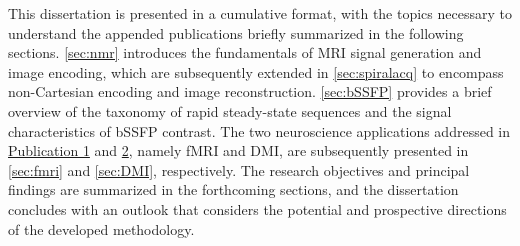 This dissertation is presented in a cumulative format, with the topics necessary to understand the appended publications briefly summarized in the following sections. \cref{sec:nmr} introduces the fundamentals of \gls{MRI} signal generation and image encoding, which are subsequently extended in \cref{sec:spiralacq} to encompass non-Cartesian encoding and image reconstruction. \cref{sec:bSSFP} provides a brief overview of the taxonomy of rapid steady-state sequences and the signal characteristics of \gls{bSSFP} contrast. The two neuroscience applications addressed in \hyperref[sec:paper1]{Publication 1} and \hyperref[sec:paper2]{2}, namely \gls{fMRI} and \gls{DMI}, are subsequently presented in \cref{sec:fmri} and \cref{sec:DMI}, respectively. The research objectives and principal findings are summarized in the forthcoming sections, and the dissertation concludes with an outlook that considers the potential and prospective directions of the developed methodology.

